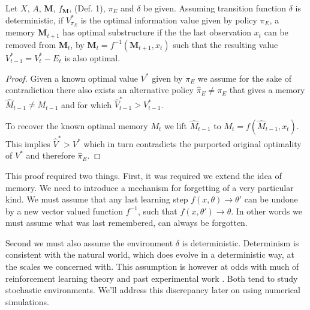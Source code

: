 \begin{theorem} \label{theorem:opt_sub} 
    Let $X$, $A$, $\mathbf{M}$, $f_{\mathbf{M}}$, (Def. 1), $\pi_E$ and $\delta$ be given. Assuming transition function $\delta$ is deterministic, if $V^*_{\pi_E}$ is the optimal information value given by policy $\pi_E$, a memory $\mathbf{M}_{t+1}$ has optimal substructure if the the last observation $x_t$ can be removed from $\mathbf{M}_t$, by $\mathbf{M}_{t} = f^{-1}(\mathbf{M}_{t+1}, x_t)$ such that the resulting value $V^*_{t-1} = V^*_{t} - E_{t}$ is also optimal. 
\end{theorem}
\begin{proof}
	Given a known optimal value $V^*$ given by $\pi_E$ we assume for the sake of contradiction there also exists an alternative policy $\hat \pi_E \neq \pi_E$ that gives a memory $\hat M_{t-1} \neq M_{t-1}$ and for which $\hat V^*_{t-1} > V^*_{t-1}$. 
	
	To recover the known optimal memory $M_t$ we lift $\hat M_{t-1}$ to $M_t = f(\hat M_{t-1}, x_t)$. This implies $\hat V^* > V^*$ which in turn contradicts the purported original optimality of $V^*$ and therefore $\hat \pi_E$.
\end{proof}

This proof required two things. First, it was required we extend the idea of memory. We need to introduce a mechanism for forgetting of a very particular kind. We must assume that any last learning step $f(x, \theta) \rightarrow \theta'$ can be undone by a new vector valued function $f^{-1}$, such that $f(x, \theta') \rightarrow \theta$. In other words we must assume what was last remembered, can always be forgotten. 

Second we must also assume the environment $\delta$ is deterministic. Determinism is consistent with the natural world, which does evolve in a deterministic way, at the scales we concerned with. This assumption is however at odds with much of reinforcement learning theory \citep{needed} and past experimental work \citep{needed}. Both tend to study stochastic environments. We'll address this discrepancy later on using numerical simulations.

